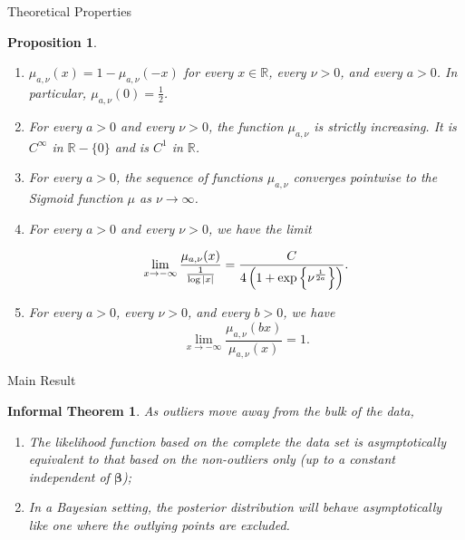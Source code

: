 \documentclass{beamer}
\newcommand{\bracket}[1]{\left ( #1 \right )}
\newcommand{\curly}[1]{\left \{ #1 \right \} }
\newtheorem{proposition}[theorem]{Proposition}
\begin{document}
\begin{frame}{Theoretical Properties}
\begin{proposition}
    \begin{enumerate}
        \item $\mu_{a,\nu}(x) = 1 - \mu_{a, \nu}(-x)$ for every $x \in \mathbb{R}$, every $\nu > 0$, and every $a > 0$.
  In particular, $\mu_{a,\nu}(0) = \frac{1}{2}$.
        \item For every $a > 0$ and every $\nu > 0$, the function $\mu_{a, \nu}$ is strictly increasing.
        It is $C^{\infty}$ in $\mathbb{R} - \{0\}$
        and is $C^1$ in $\mathbb{R}$.
        \item For every $a > 0$, the sequence of functions $\mu_{a, \nu}$ converges pointwise to the Sigmoid function 
        $\mu$ as $\nu \to \infty$.
        \item For every $a > 0$ and every $\nu > 0$, we have the limit
  
  \begin{equation*}
    \lim_{x \to -\infty} \frac{\mu_{a, \nu}(x)}{\frac{1}{\log \abs{x}}} = 
    \frac{C}{4 \bracket{1 + \exp \curly{\nu^{\frac{1}{2a}}}}}.
  \end{equation*}
        \item For every $a > 0$, every $\nu > 0$, and every $b > 0$, we have 
        \begin{equation*}
            \lim_{x \to - \infty} \frac{\mu_{a,\nu}(bx)}{\mu_{a,\nu}(x)} = 1.
        \end{equation*}
    \end{enumerate}
\end{proposition}

\end{frame}

\begin{frame}{Main Result}

    \newtheorem{informal_theorem}{Informal Theorem}

\begin{informal_theorem}
        As outliers move away from the bulk of the data,
    \begin{enumerate}
        \item The likelihood function based on the 
        complete the data set is asymptotically equivalent to 
        that based on the non-outliers only 
        (up to a constant independent of $\bm{\beta}$);
        \item In a Bayesian setting, the posterior distribution will 
        behave asymptotically like one where the outlying points are excluded.
        
    \end{enumerate}
\end{informal_theorem}

\end{frame}
\end{document}
